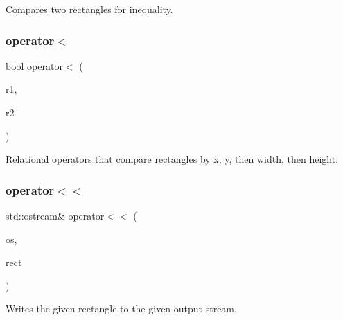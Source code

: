 Compares two rectangles for inequality. 

\mbox{\label{structGRectangle_a4a0fc8587bc8eccebfdd62416942c5d8}} 
\subsubsection{\texorpdfstring{operator$<$}{operator<}}
{\footnotesize\ttfamily bool operator$<$ (\begin{DoxyParamCaption}\item[{const \mbox{\hyperlink{structGRectangle}{G\+Rectangle}} \&}]{r1,  }\item[{const \mbox{\hyperlink{structGRectangle}{G\+Rectangle}} \&}]{r2 }\end{DoxyParamCaption})\hspace{0.3cm}{\ttfamily [friend]}}



Relational operators that compare rectangles by x, y, then width, then height. 

\mbox{\label{structGRectangle_a9986499c29c915ee31d512f44a8f8a0d}} 
\subsubsection{\texorpdfstring{operator$<$$<$}{operator<<}}
{\footnotesize\ttfamily std\+::ostream\& operator$<$$<$ (\begin{DoxyParamCaption}\item[{std\+::ostream \&}]{os,  }\item[{const \mbox{\hyperlink{structGRectangle}{G\+Rectangle}} \&}]{rect }\end{DoxyParamCaption})\hspace{0.3cm}{\ttfamily [friend]}}



Writes the given rectangle to the given output stream. 

\mbox{\label{structGRectangle_a3588a1e1157026c5ef8c0ed41ba78890}} 
